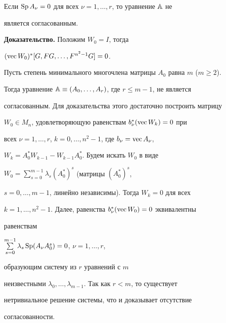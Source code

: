 \begin{cor}


\label{cor3}


Если $\operatorname{Sp} A_{\nu}=0$ для всех ${\nu}=1,\dotsc,r$, то уравнение $\Bbb A$ не


является согласованным.


\end{cor}





{\bf Доказательство.} Положим $W_0=I$, тогда


$(\operatorname{vec} W_0)^*[G,FG,\dotsc,F^{n^2-1}G]=0$.





\begin{exam}


\label{ex3}


Пусть степень минимального многочлена матрицы $A_0$ равна $m$ ($m\ge 2$).


Тогда уравнение $\Bbb A\equiv(A_0,\dotsc,A_r)$, где $r\le m-1$, не является


согласованным. Для доказательства этого достаточно построить матрицу


$W_0\in M_n$, удовлетворяющую равенствам $b_{\nu}^*(\operatorname{vec} W_k)=0$ при


всех $\nu=1,\dotsc,r$, $k=0,\dotsc,n^2-1$, где $b_{\nu}=\operatorname{vec} A_{\nu}$,


$W_k=A_0^*W_{k-1}-W_{k-1}A_0^*$. Будем искать $W_0$ в виде


$W_0=\sum\limits_{s=0}^{m-1}\lambda_s(A_0^*)^s$ (матрицы $(A_0^*)^s$,


$s=0,\dotsc,m-1$, линейно независимы). Тогда $W_k=0$ для всех


$k=1,\dotsc,n^2-1$. Далее, равенства $b_{\nu}^*(\operatorname{vec} W_0)=0$ эквивалентны


равенствам


$\sum\limits_{s=0}^{m-1}\lambda_s\operatorname{Sp}(A_{\nu}A_0^s)=0$, $\nu=1,\dotsc,r$,


образующим систему из $r$ уравнений с $m$


неизвестными $\lambda_0,\dotsc,\lambda_{m-1}$. Так как $r<m$, то существует


нетривиальное решение системы, что и доказывает отсутствие


согласованности.


\end{exam}






